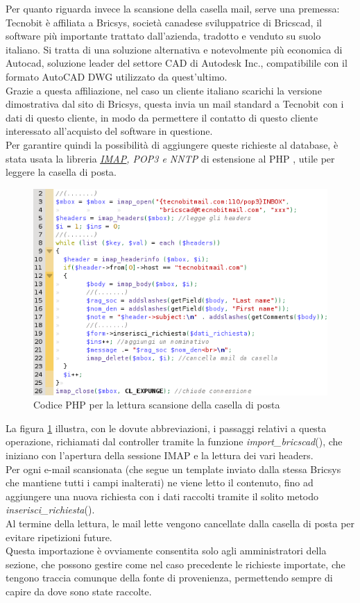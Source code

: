 \noindent
Per quanto riguarda invece la scansione della casella mail, serve una premessa: Tecnobit \`e affiliata a Bricsys, societ\`a canadese sviluppatrice di Bricscad, il software pi\`u importante trattato dall'azienda, tradotto e venduto su suolo italiano. Si tratta di una soluzione alternativa e notevolmente pi\`u economica di Autocad, soluzione leader del settore CAD di Autodesk Inc., compatibilile con il formato AutoCAD DWG utilizzato da quest'ultimo. \\
Grazie a questa affiliazione, nel caso un cliente italiano scarichi la versione dimostrativa dal sito di Bricsys, questa invia un mail standard a Tecnobit con i dati di questo cliente, in modo da permettere il contatto di questo cliente interessato all'acquisto del software in questione.\\
Per garantire quindi la possibilit\`a di aggiungere queste richieste al database, \`e stata usata la libreria \textit{\hyperlink{imap}{\underline{IMAP}}, POP3 e NNTP} di estensione al PHP \cite{quattro}, utile per leggere la casella di posta.
\newpage

\begin{figure}[!ht]
\centering
  \includegraphics[scale=0.9]{./images/codicebrics.png}
\caption{Codice PHP per la lettura scansione della casella di posta}
\label{bricscode}
\end{figure}

\noindent La figura \ref{bricscode} illustra, con le dovute abbreviazioni, i passaggi relativi a questa operazione, richiamati dal controller tramite la funzione \textit{import\_bricscad}(), che iniziano con l'apertura della sessione IMAP e la lettura dei vari headers.\\
Per ogni e-mail scansionata (che segue un template inviato dalla stessa Bricsys che mantiene tutti i campi inalterati) ne viene letto il contenuto, fino ad aggiungere una nuova richiesta con i dati raccolti tramite il solito metodo \textit{inserisci\_richiesta}(). \\
Al termine della lettura, le mail lette vengono cancellate dalla casella di posta per evitare ripetizioni future.\\
Questa importazione \`e ovviamente consentita solo agli amministratori della sezione, che possono gestire come nel caso precedente le richieste importate, che tengono traccia comunque della fonte di provenienza, permettendo sempre di capire da dove sono state raccolte.

